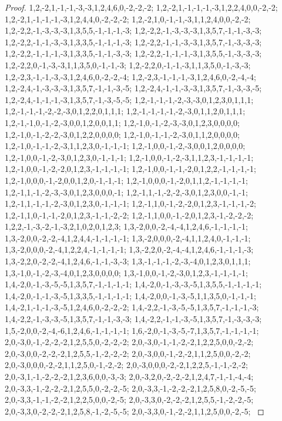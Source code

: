 \documentclass{article}
\begin{document}
\begin{proof}
{{1,2,-2,1,-1,-1,-3,-3,1,2,4,6,0,-2,-2,-2; 1,2,-2,1,-1,-1,-1,-3,1,2,2,4,0,0,-2,-2; 1,2,-2,1,-1,-1,-1,-3,1,2,4,4,0,-2,-2,-2; 1,2,-2,1,0,-1,-1,-3,1,1,2,4,0,0,-2,-2; 1,2,-2,2,-1,-3,-3,-3,1,3,5,5,-1,-1,-1,-3; 1,2,-2,2,-1,-3,-3,-3,1,3,5,7,-1,-1,-3,-3; 1,2,-2,2,-1,-1,-3,-3,1,3,3,5,-1,-1,-1,-3; 1,2,-2,2,-1,-1,-3,-3,1,3,5,7,-1,-3,-3,-3; 1,2,-2,2,-1,-1,-1,-3,1,3,3,5,-1,-1,-3,-3; 1,2,-2,2,-1,-1,-1,-3,1,3,5,5,-1,-3,-3,-3; 1,2,-2,2,0,-1,-3,-3,1,1,3,5,0,-1,-1,-3; 1,2,-2,2,0,-1,-1,-3,1,1,3,5,0,-1,-3,-3;
1,2,-2,3,-1,-1,-3,-3,1,2,4,6,0,-2,-2,-4; 1,2,-2,3,-1,-1,-1,-3,1,2,4,6,0,-2,-4,-4; 1,2,-2,4,-1,-3,-3,-3,1,3,5,7,-1,-1,-3,-5; 1,2,-2,4,-1,-1,-3,-3,1,3,5,7,-1,-3,-3,-5; 1,2,-2,4,-1,-1,-1,-3,1,3,5,7,-1,-3,-5,-5; 1,2,-1,-1,-1,-2,-3,-3,0,1,2,3,0,1,1,1; 1,2,-1,-1,-1,-2,-2,-3,0,1,2,2,0,1,1,1; 1,2,-1,-1,-1,-1,-2,-3,0,1,1,2,0,1,1,1; 1,2,-1,-1,0,-1,-2,-3,0,0,1,2,0,0,1,1; 1,2,-1,0,-1,-2,-3,-3,0,1,2,3,0,0,0,0; 1,2,-1,0,-1,-2,-2,-3,0,1,2,2,0,0,0,0; 1,2,-1,0,-1,-1,-2,-3,0,1,1,2,0,0,0,0;
1,2,-1,0,-1,-1,-2,-3,1,1,2,3,0,-1,-1,-1; 1,2,-1,0,0,-1,-2,-3,0,0,1,2,0,0,0,0; 1,2,-1,0,0,-1,-2,-3,0,1,2,3,0,-1,-1,-1; 1,2,-1,0,0,-1,-2,-3,1,1,2,3,-1,-1,-1,-1; 1,2,-1,0,0,-1,-2,-2,0,1,2,3,-1,-1,-1,-1; 1,2,-1,0,0,-1,-1,-2,0,1,2,2,-1,-1,-1,-1; 1,2,-1,0,0,0,-1,-2,0,0,1,2,0,-1,-1,-1; 1,2,-1,0,0,0,-1,-2,0,1,1,2,-1,-1,-1,-1; 1,2,-1,1,-1,-2,-3,-3,0,1,2,3,0,0,0,-1; 1,2,-1,1,-1,-2,-2,-3,0,1,2,3,0,0,-1,-1; 1,2,-1,1,-1,-1,-2,-3,0,1,2,3,0,-1,-1,-1; 1,2,-1,1,0,-1,-2,-2,0,1,2,3,-1,-1,-1,-2;
1,2,-1,1,0,-1,-1,-2,0,1,2,3,-1,-1,-2,-2; 1,2,-1,1,0,0,-1,-2,0,1,2,3,-1,-2,-2,-2; 1,2,2,-1,-3,-2,-1,-3,2,1,0,2,0,1,2,3; 1,3,-2,0,0,-2,-4,-4,1,2,4,6,-1,-1,-1,-1; 1,3,-2,0,0,-2,-2,-4,1,2,4,4,-1,-1,-1,-1; 1,3,-2,0,0,0,-2,-4,1,1,2,4,0,-1,-1,-1; 1,3,-2,0,0,0,-2,-4,1,2,2,4,-1,-1,-1,-1; 1,3,-2,2,0,-2,-4,-4,1,2,4,6,-1,-1,-1,-3; 1,3,-2,2,0,-2,-2,-4,1,2,4,6,-1,-1,-3,-3; 1,3,-1,-1,-1,-2,-3,-4,0,1,2,3,0,1,1,1; 1,3,-1,0,-1,-2,-3,-4,0,1,2,3,0,0,0,0; 1,3,-1,0,0,-1,-2,-3,0,1,2,3,-1,-1,-1,-1;
1,4,-2,0,-1,-3,-5,-5,1,3,5,7,-1,-1,-1,-1; 1,4,-2,0,-1,-3,-3,-5,1,3,5,5,-1,-1,-1,-1; 1,4,-2,0,-1,-1,-3,-5,1,3,3,5,-1,-1,-1,-1; 1,4,-2,0,0,-1,-3,-5,1,1,3,5,0,-1,-1,-1; 1,4,-2,1,-1,-1,-3,-5,1,2,4,6,0,-2,-2,-2; 1,4,-2,2,-1,-3,-5,-5,1,3,5,7,-1,-1,-1,-3; 1,4,-2,2,-1,-3,-3,-5,1,3,5,7,-1,-1,-3,-3; 1,4,-2,2,-1,-1,-3,-5,1,3,5,7,-1,-3,-3,-3; 1,5,-2,0,0,-2,-4,-6,1,2,4,6,-1,-1,-1,-1; 1,6,-2,0,-1,-3,-5,-7,1,3,5,7,-1,-1,-1,-1; 2,0,-3,0,-1,-2,-2,-2,1,2,5,5,0,-2,-2,-2; 2,0,-3,0,-1,-1,-2,-2,1,2,2,5,0,0,-2,-2;
2,0,-3,0,0,-2,-2,-2,1,2,5,5,-1,-2,-2,-2; 2,0,-3,0,0,-1,-2,-2,1,1,2,5,0,0,-2,-2; 2,0,-3,0,0,0,-2,-2,1,1,2,5,0,-1,-2,-2; 2,0,-3,0,0,0,-2,-2,1,2,2,5,-1,-1,-2,-2; 2,0,-3,1,-1,-2,-2,-2,1,2,3,6,0,0,-3,-3; 2,0,-3,2,0,-2,-2,-2,1,2,4,7,-1,-1,-4,-4; 2,0,-3,3,-1,-2,-2,-2,1,2,5,5,0,-2,-2,-5; 2,0,-3,3,-1,-2,-2,-2,1,2,5,8,0,-2,-5,-5; 2,0,-3,3,-1,-1,-2,-2,1,2,2,5,0,0,-2,-5; 2,0,-3,3,0,-2,-2,-2,1,2,5,5,-1,-2,-2,-5; 2,0,-3,3,0,-2,-2,-2,1,2,5,8,-1,-2,-5,-5; 2,0,-3,3,0,-1,-2,-2,1,1,2,5,0,0,-2,-5;
}}
\end{proof}
\end{document}
